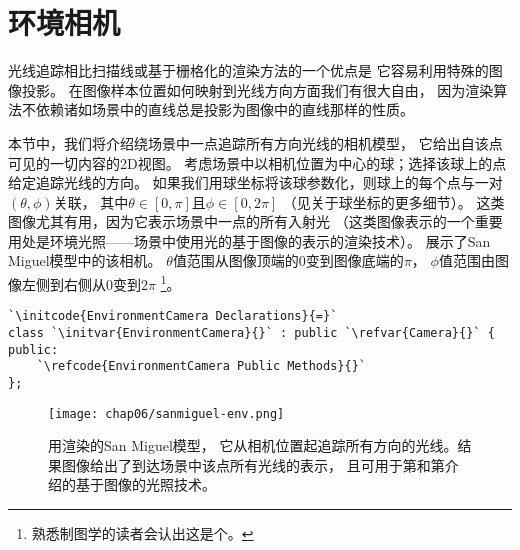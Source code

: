 \section{环境相机}\label{sec:环境相机}
光线追踪相比扫描线或基于栅格化的渲染方法的一个优点是
它容易利用特殊的图像投影。
在图像样本位置如何映射到光线方向方面我们有很大自由，
因为渲染算法不依赖诸如场景中的直线总是投影为图像中的直线那样的性质。

本节中，我们将介绍绕场景中一点追踪所有方向光线的相机模型，
它给出自该点可见的一切内容的2D视图。
考虑场景中以相机位置为中心的球；选择该球上的点给定追踪光线的方向。
如果我们用球坐标将该球参数化，则球上的每个点与一对$(\theta,\phi)$关联，
其中$\theta\in[0,\pi]$且$\phi\in[0,2\pi]$
（见关于球坐标的更多细节）。
这类图像尤其有用，因为它表示场景中一点的所有入射光
（这类图像表示的一个重要用处是环境光照——场景中使用光的基于图像的表示的渲染技术）。
展示了San Miguel模型中的该相机。
$\theta$值范围从图像顶端的0变到图像底端的$\pi$，
$\phi$值范围由图像左侧到右侧从0变到$2\pi$
\footnote{熟悉制图学的读者会认出这是个。}。
\begin{lstlisting}
`\initcode{EnvironmentCamera Declarations}{=}`
class `\initvar{EnvironmentCamera}{}` : public `\refvar{Camera}{}` {
public:
    `\refcode{EnvironmentCamera Public Methods}{}`
};
\end{lstlisting}
\begin{figure}[htbp]
    \centering\texttt{[image: chap06/sanmiguel-env.png]}
    \caption{用渲染的San Miguel模型，
    它从相机位置起追踪所有方向的光线。结果图像给出了到达场景中该点所有光线的表示，
    且可用于第和第介绍的基于图像的光照技术。}
    \label{fig:6.14}
\end{figure}

